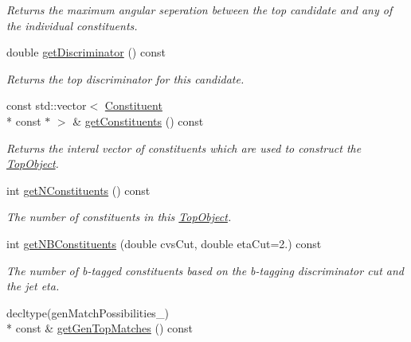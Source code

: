 \begin{DoxyCompactItemize}
\begin{DoxyCompactList}\small\item\em Returns the maximum angular seperation between the top candidate and any of the individual constituents. \end{DoxyCompactList}\item 
\hypertarget{classTopObject_a144b61f5139eb1bef7bc00cee17deaf7}{double \hyperlink{classTopObject_a144b61f5139eb1bef7bc00cee17deaf7}{get\-Discriminator} () const }\label{classTopObject_a144b61f5139eb1bef7bc00cee17deaf7}

\begin{DoxyCompactList}\small\item\em Returns the top discriminator for this candidate. \end{DoxyCompactList}\item 
\hypertarget{classTopObject_a3bd54d089da20318d1733c2d4e28493a}{const std\-::vector$<$ \hyperlink{classConstituent}{Constituent} \\*
const $\ast$ $>$ \& \hyperlink{classTopObject_a3bd54d089da20318d1733c2d4e28493a}{get\-Constituents} () const }\label{classTopObject_a3bd54d089da20318d1733c2d4e28493a}

\begin{DoxyCompactList}\small\item\em Returns the interal vector of constituents which are used to construct the \hyperlink{classTopObject}{Top\-Object}. \end{DoxyCompactList}\item 
\hypertarget{classTopObject_a562bafee171bf66c283d519c8021672d}{int \hyperlink{classTopObject_a562bafee171bf66c283d519c8021672d}{get\-N\-Constituents} () const }\label{classTopObject_a562bafee171bf66c283d519c8021672d}

\begin{DoxyCompactList}\small\item\em The number of constituents in this \hyperlink{classTopObject}{Top\-Object}. \end{DoxyCompactList}\item 
\hypertarget{classTopObject_a2b5bb6b014c80262b748171698ba1042}{int \hyperlink{classTopObject_a2b5bb6b014c80262b748171698ba1042}{get\-N\-B\-Constituents} (double cvs\-Cut, double eta\-Cut=2.) const }\label{classTopObject_a2b5bb6b014c80262b748171698ba1042}

\begin{DoxyCompactList}\small\item\em The number of b-\/tagged constituents based on the b-\/tagging discriminator cut and the jet eta. \end{DoxyCompactList}\item 
\hypertarget{classTopObject_a51cc6fbaacb2cf502cad0b57d99ae91f}{decltype(gen\-Match\-Possibilities\-\_\-) \\*
const \& \hyperlink{classTopObject_a51cc6fbaacb2cf502cad0b57d99ae91f}{get\-Gen\-Top\-Matches} () const }\label{classTopObject_a51cc6fbaacb2cf502cad0b57d99ae91f}


\end{DoxyCompactItemize}
